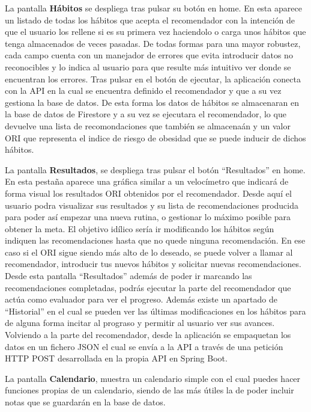 La pantalla \textbf{Hábitos} se despliega tras pulsar su botón en home. En esta aparece un listado de todas los hábitos que acepta el recomendador con la intención de que el usuario los rellene si es su primera vez haciendolo o carga unos hábitos que tenga almacenados de veces pasadas. De todas formas para una mayor robustez, cada campo cuenta con un manejador de errores que evita introducir datos no reconocibles y lo indica al usuario para que resulte más intuitivo ver donde se encuentran los errores. Tras pulsar en el botón de ejecutar, la aplicación conecta con la API en la cual se encuentra definido el recomendador y que a su vez gestiona la base de datos. De esta forma los datos de hábitos se almacenaran en la base de datos de Firestore y a su vez se ejecutara el recomendador, lo que devuelve una lista de recomondaciones que también se almacenaán y un valor ORI que representa el indice de riesgo de obesidad que se puede inducir de dichos hábitos. 

La pantalla \textbf{Resultados}, se despliega tras pulsar el botón ``Resultados'' en home. En esta pestaña aparece una gráfica similar a un velocímetro que indicará de forma visual los resultados ORI obtenidos por el recomendador. Desde aquí el usuario podra visualizar sus resultados y su lista de recomendaciones producida para poder así empezar una nueva rutina, o gestionar lo máximo posible para obtener la meta.
El objetivo idílico sería ir modificando los hábitos según indiquen las recomendaciones hasta que no quede ninguna recomendación. En ese caso si el ORI sigue siendo más alto de lo deseado, se puede volver a llamar al recomendador, introducir tus nuevos hábitos y solicitar nuevas recomendaciones. Desde esta pantalla ``Resultados'' además de poder ir marcando las recomendaciones completadas, podrás ejecutar la parte del recomendador que actúa como evaluador para ver el progreso. 
Además existe un apartado de ``Historial'' en el cual se pueden ver las últimas modificaciones en los hábitos para de alguna forma incitar al prograso y permitir al usuario ver sus avances.
Volviendo a la parte del recomendador, desde la aplicación se empaquetan los datos en un fichero JSON el cual se envía a la API a través de una petición HTTP POST desarrollada en la propia API en Spring Boot.

La pantalla \textbf{Calendario}, muestra un calendario simple con el cual puedes hacer funciones propias de un calendario, siendo de las más útiles la de poder incluir notas que se guardarán en la base de datos.

